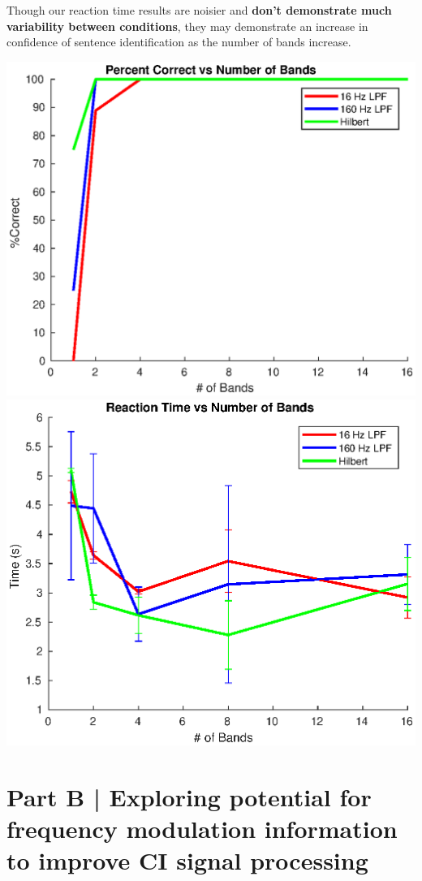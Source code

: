 \documentclass[9pt]{extarticle}
\begin{document}
\begin{enumerate}[label = \alph*) ]
Though our reaction time results are noisier and \textbf{don't demonstrate much variability between conditions}, they may demonstrate an increase in confidence of sentence identification as the number of bands increase. 

\begin{center}
\includegraphics[width = .47\textwidth]{figA1}
\includegraphics[width = .47\textwidth]{figA2}
\end{center}

\end{enumerate}


\section{Part B | Exploring potential for frequency modulation information to improve CI signal processing}
\end{document}

